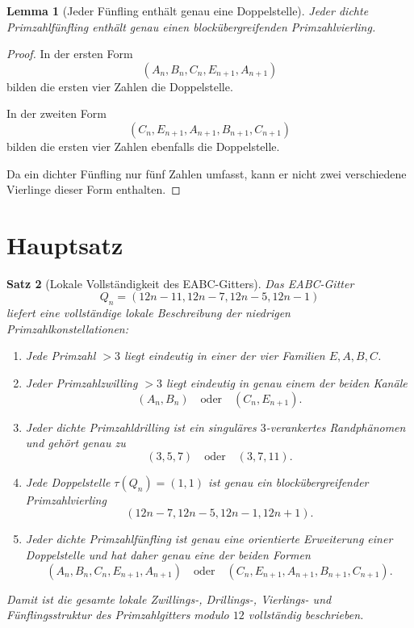 \documentclass[11pt,a4paper]{article}
\newtheorem{satz}{Satz}
\newtheorem{lemma}[satz]{Lemma}
\theoremstyle{definition}
\theoremstyle{remark}
\begin{document}
	\begin{lemma}[Jeder Fünfling enthält genau eine Doppelstelle]
		Jeder dichte Primzahlfünfling enthält genau einen blockübergreifenden Primzahlvierling.
	\end{lemma}
	
	\begin{proof}
		In der ersten Form
		\[
		(A_n,B_n,C_n,E_{n+1},A_{n+1})
		\]
		bilden die ersten vier Zahlen die Doppelstelle.
		
		In der zweiten Form
		\[
		(C_n,E_{n+1},A_{n+1},B_{n+1},C_{n+1})
		\]
		bilden die ersten vier Zahlen ebenfalls die Doppelstelle.
		
		Da ein dichter Fünfling nur fünf Zahlen umfasst, kann er nicht zwei verschiedene Vierlinge
		dieser Form enthalten.
	\end{proof}
	
	\section{Hauptsatz}
	
	\begin{satz}[Lokale Vollständigkeit des EABC-Gitters]
		Das EABC-Gitter
		\[
		Q_n=(12n-11,12n-7,12n-5,12n-1)
		\]
		liefert eine vollständige lokale Beschreibung der niedrigen Primzahlkonstellationen:
		
		\begin{enumerate}[label=\textup{(\roman*)}]
			\item Jede Primzahl \(>3\) liegt eindeutig in einer der vier Familien \(E,A,B,C\).
			\item Jeder Primzahlzwilling \(>3\) liegt eindeutig in genau einem der beiden Kanäle
			\[
			(A_n,B_n)
			\quad\text{oder}\quad
			(C_n,E_{n+1}).
			\]
			\item Jeder dichte Primzahldrilling ist ein singuläres \(3\)-verankertes Randphänomen und gehört
			genau zu
			\[
			(3,5,7)
			\quad\text{oder}\quad
			(3,7,11).
			\]
			\item Jede Doppelstelle \(\tau(Q_n)=(1,1)\) ist genau ein blockübergreifender Primzahlvierling
			\[
			(12n-7,12n-5,12n-1,12n+1).
			\]
			\item Jeder dichte Primzahlfünfling ist genau eine orientierte Erweiterung einer Doppelstelle und
			hat daher genau eine der beiden Formen
			\[
			(A_n,B_n,C_n,E_{n+1},A_{n+1})
			\quad\text{oder}\quad
			(C_n,E_{n+1},A_{n+1},B_{n+1},C_{n+1}).
			\]
		\end{enumerate}
		
		Damit ist die gesamte lokale Zwillings-, Drillings-, Vierlings- und Fünflingsstruktur des
		Primzahlgitters modulo \(12\) vollständig beschrieben.
	\end{satz}
	
\end{document}

